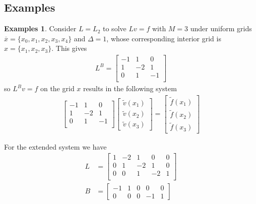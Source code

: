 \documentclass[11pt]{article}
\theoremstyle{definition}
\newtheorem{example}{Examples}[section]
\begin{document}
\subsection{Examples}

\begin{example}\label{ex:gaussian-elimination-reflecting-barrier}
	Consider $L = L_{2}$ to solve $L v = f$ with $M = 3$ under uniform grids $\overline{x} = \{x_0, x_1, x_2, x_3, x_4\}$ and $\Delta = 1$, whose corresponding interior grid is $x = \{x_1, x_2, x_3\}$. This gives
	\begin{align}
	L^B = 	 \begin{bmatrix}
	-1 & 1 & 0 \\
	1 & -2 & 1 \\
	0 & 1 & -1 \\
	\end{bmatrix}
	\end{align}
	so $L^B v= f$ on the grid $x$ results in the following system
	\begin{align} \label{eq:extended-system-reflecting-barrier-reduced-system}
	\begin{bmatrix}
	-1 & 1 & 0  \\
	1 & -2 & 1 \\
	0 & 1 & -1 \\
	\end{bmatrix} 	  \begin{bmatrix}
	\tilde{v}(x_1) \\
	\tilde{v}(x_2) \\
	\tilde{v}(x_3)
	\end{bmatrix}
	=
	\begin{bmatrix}
	\tilde{f}(x_1) \\
	\tilde{f}(x_2) \\
	\tilde{f}(x_3)
	\end{bmatrix}
	\end{align}


	For the extended system we have
	\begin{align}
	{L} &=
	\begin{bmatrix}
	1 & -2 & 1 & 0 & 0 \\
	0 & 1 & -2 & 1 & 0 \\
	0 & 0 & 1 & -2 & 1 \\
	\end{bmatrix} \\
	B &= \begin{bmatrix}
	-1 & 1  & 0 & 0 & 0 \\
	0 & 0 & 0 & -1 & 1
	\end{bmatrix}
	\end{align}


\end{example}
\end{document}
